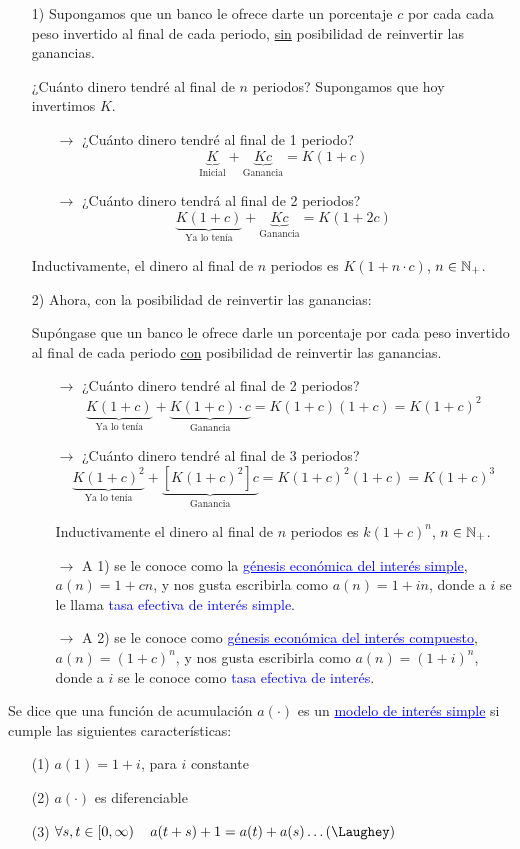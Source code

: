 \begin{enumerate}
\item[1)] Supongamos que un banco le ofrece darte un porcentaje $c$ por cada cada peso invertido al final de cada periodo, \underline{sin} posibilidad de reinvertir las ganancias.

¿Cuánto dinero tendré al final de $n$ periodos? Supongamos que hoy invertimos $K$.
\begin{itemize}
\item[$\longrightarrow$] ¿Cuánto dinero tendré al final de 1 periodo?
\[  \underbrace{K}_{\text{Inicial}} + \underbrace{Kc}_{\text{Ganancia}} = K(1+c)\]
\item[$\longrightarrow$] ¿Cuánto dinero tendrá al final de 2 periodos?
\[ \underbrace{K(1+c)}_{\text{Ya lo tenía}} + \underbrace{Kc}_{\text{Ganancia}} = K(1+2c)\]
\end{itemize}
Inductivamente, el dinero al final de $n$ periodos es $K(1+n\cdot c)$, $n\in \mathbb N_+$.
\item[2)] Ahora, con la posibilidad de reinvertir las ganancias:

Supóngase que un banco le ofrece darle un porcentaje por cada peso invertido al final de cada periodo \underline{con} posibilidad de reinvertir las ganancias.
\begin{itemize}
\item[$\longrightarrow$] ¿Cuánto dinero tendré al final de 2 periodos?
\[ \underbrace{K(1+c)}_{\text{Ya lo tenía}} + \underbrace{K(1+c)\cdot c}_{\text{Ganancia}} = K(1+c)(1+c) = K(1+c)^2\]
\item[$\longrightarrow$] ¿Cuánto dinero tendré al final de 3 periodos?
\[ \underbrace{K(1+c)^2}_{\text{Ya lo tenía}} + \underbrace{[K(1+c)^2]c}_{\text{Ganancia}} = K(1+c)^2(1+c) = K(1+c)^3\]

Inductivamente el dinero al final de $n$ periodos es $k(1+c)^n$, $n\in \mathbb N_+$.
\bigskip
\item[$\longrightarrow$] A 1) se le conoce como la \textcolor{blue}{\underline{génesis económica del interés simple}}, $a(n) = 1+cn$, y nos gusta escribirla como $a(n) = 1+in$, donde a $i$ se le llama \textcolor{blue}{tasa efectiva de interés simple}.
\item[$\longrightarrow$] A 2) se le conoce como \textcolor{blue}{\underline{génesis económica del interés compuesto}}, $a(n) = (1+c)^n$, y nos gusta escribirla como $a(n) = (1+i)^n$, donde a $i$ se le conoce como \textcolor{blue}{tasa efectiva de interés}.
\end{itemize}
\end{enumerate}
\newpage
\begin{definition}
Se dice que una función de acumulación $a(\cdot )$ es un \textcolor{blue}{\underline{modelo de interés simple}} si cumple las siguientes características:
\begin{enumerate}
\item[(1)] $a(1) = 1+ i$, para $i$ constante
\item[(2)] $a(\cdot)$ es diferenciable
\item[(3)] $\forall s,t \in \left[0,\infty \right) \quad a(t+s)+1 = a(t) + a(s) \ldots (\Laughey)$
\end{enumerate}
\end{definition}

